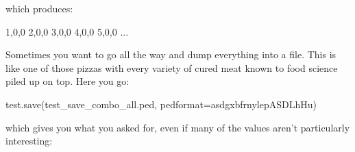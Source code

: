 \documentclass[
  letterpaper,
  DIV=11,
  numbers=noendperiod]{scrreprt}
\newenvironment{Shaded}{\begin{snugshade}}{\end{snugshade}}
\newcommand{\DecValTok}[1]{\textcolor[rgb]{0.68,0.00,0.00}{#1}}
\newcommand{\NormalTok}[1]{\textcolor[rgb]{0.00,0.23,0.31}{#1}}
\newcommand{\OperatorTok}[1]{\textcolor[rgb]{0.37,0.37,0.37}{#1}}
\newcommand{\StringTok}[1]{\textcolor[rgb]{0.13,0.47,0.30}{#1}}
\begin{document}
which produces:

\begin{Shaded}
\begin{Highlighting}[]
\DecValTok{1}\NormalTok{,}\DecValTok{0}\NormalTok{,}\DecValTok{0}
\DecValTok{2}\NormalTok{,}\DecValTok{0}\NormalTok{,}\DecValTok{0}
\DecValTok{3}\NormalTok{,}\DecValTok{0}\NormalTok{,}\DecValTok{0}
\DecValTok{4}\NormalTok{,}\DecValTok{0}\NormalTok{,}\DecValTok{0}
\DecValTok{5}\NormalTok{,}\DecValTok{0}\NormalTok{,}\DecValTok{0}
\NormalTok{...}
\end{Highlighting}
\end{Shaded}

Sometimes you want to go all the way and dump everything into a file.
This is like one of those pizzas with every variety of cured meat known
to food science piled up on top. Here you go:

\begin{Shaded}
\begin{Highlighting}[]
\NormalTok{test.save(}\StringTok{\textquotesingle{}test\_save\_combo\_all.ped\textquotesingle{}}\NormalTok{, pedformat}\OperatorTok{=}\StringTok{\textquotesingle{}asdgxbfrnylepASDLhHu\textquotesingle{}}\NormalTok{)}
\end{Highlighting}
\end{Shaded}

which gives you what you asked for, even if many of the values aren't
particularly interesting:
\end{document}
